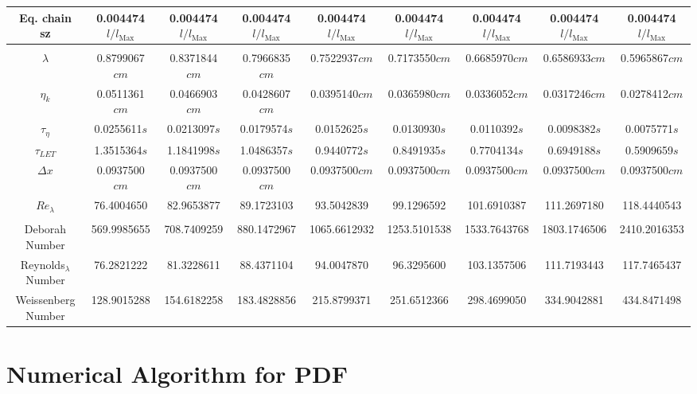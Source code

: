 \documentclass[]{article}
\begin{document}
\begin{table}
\begin{tabular}{ccccccccc}
Eq. chain sz  &  0.004474$l/l_{\text{Max}}$ &  0.004474$l/l_{\text{Max}}$ &  0.004474$l/l_{\text{Max}}$ &  0.004474$l/l_{\text{Max}}$ &  0.004474$l/l_{\text{Max}}$ &  0.004474$l/l_{\text{Max}}$ &  0.004474$l/l_{\text{Max}}$ &  0.004474$l/l_{\text{Max}}$\\ 
\hline
\\ 
$\lambda$ &   0.8799067$cm$ &   0.8371844$cm$ &   0.7966835$cm$ &   0.7522937$cm$ &   0.7173550$cm$ &   0.6685970$cm$ &   0.6586933$cm$ &   0.5965867$cm$\\ 
$\eta_{k}$ &   0.0511361$cm$ &   0.0466903$cm$ &   0.0428607$cm$ &   0.0395140$cm$ &   0.0365980$cm$ &   0.0336052$cm$ &   0.0317246$cm$ &   0.0278412$cm$\\ 
$\tau_\eta$ &   0.0255611$s$ &   0.0213097$s$ &   0.0179574$s$ &   0.0152625$s$ &   0.0130930$s$ &   0.0110392$s$ &   0.0098382$s$ &   0.0075771$s$\\ 
$\tau_{LET}$ &   1.3515364$s$ &   1.1841998$s$ &   1.0486357$s$ &   0.9440772$s$ &   0.8491935$s$ &   0.7704134$s$ &   0.6949188$s$ &   0.5909659$s$\\ 
$\Delta x$ &   0.0937500$cm$ &   0.0937500$cm$ &   0.0937500$cm$ &   0.0937500$cm$ &   0.0937500$cm$ &   0.0937500$cm$ &   0.0937500$cm$ &   0.0937500$cm$\\ 
$Re_\lambda$ &   76.4004650 &   82.9653877 &   89.1723103 &   93.5042839 &   99.1296592 &   101.6910387 &   111.2697180 &   118.4440543\\ 
\hline
\\
Deborah Number &   569.9985655 &   708.7409259 &   880.1472967 &   1065.6612932 &   1253.5101538 &   1533.7643768 &   1803.1746506 &   2410.2016353\\ 
Reynolds$_\lambda$ Number &   76.2821222 &   81.3228611 &   88.4371104 &   94.0047870 &   96.3295600 &   103.1357506 &   111.7193443 &   117.7465437\\ 
Weissenberg Number &   128.9015288 &   154.6182258 &   183.4828856 &   215.8799371 &   251.6512366 &   298.4699050 &   334.9042881 &   434.8471498\\ 
\end{tabular}\end{table}

\section{Numerical Algorithm for PDF}
\newpage
\end{document}

